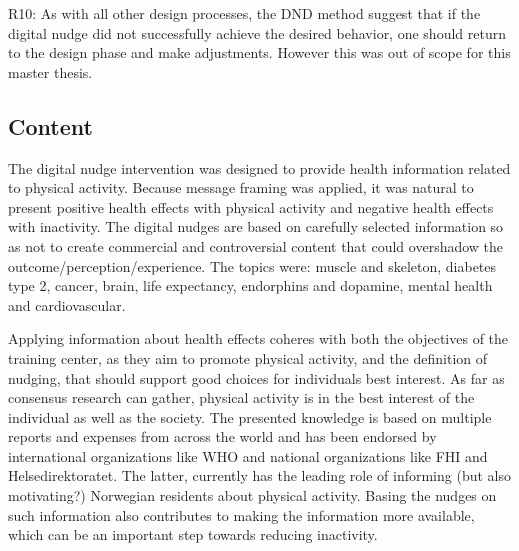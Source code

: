 R10: As with all other design processes, the DND method suggest that if the digital nudge did not successfully achieve the desired behavior, one should return to the design phase and make adjustments. However this was out of scope for this master thesis. 

\subsection{Content}
The digital nudge intervention was designed to provide health information related to physical activity. Because message framing was applied, it was natural to present positive health effects with physical activity and negative health effects with inactivity. The digital nudges are based on carefully selected information so as not to create commercial and controversial content that could overshadow the outcome/perception/experience. The topics were: muscle and skeleton, diabetes type 2, cancer, brain, life expectancy, endorphins and dopamine, mental health and cardiovascular. 

Applying information about health effects coheres with both the objectives of the training center, as they aim to promote physical activity, and the definition of nudging, that should support good choices for individuals best interest. As far as consensus research can gather, physical activity is in the best interest of the individual as well as the society. The presented knowledge is based on multiple reports and expenses from across the world and has been endorsed by international organizations like WHO and national organizations like FHI and Helsedirektoratet. The latter, currently has the leading role of informing (but also motivating?) Norwegian residents about physical activity. Basing the nudges on such information also contributes to making the information more available, which can be an important step towards reducing inactivity. 

